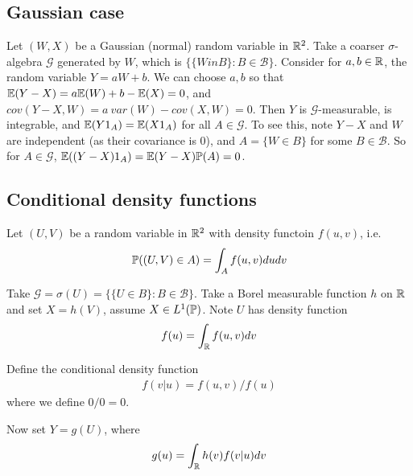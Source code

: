 \documentclass[a4paper]{article}
\begin{document}
\subsection{Gaussian case}
Let $(W,X)$ be a Gaussian (normal) random variable in $\R^2$. Take a coarser $\sigma$-algebra $\mathcal{G}$ generated by $W$, which is $\{\{W in B\}: B \in \mathcal{B}\}$. Consider for $a,b \in \R$, the random variable $Y = aW + b$. We can choose $a,b$ so that $\E(Y-X) = a \E(W)+b - \E(X) = 0$, and $cov(Y-X,W) = a\ var(W) - cov(X,W) =0$. Then $Y$ is $\mathcal{G}$-measurable, is integrable, and $\E(Y1_A) = \E(X1_A)$ for all $A \in \mathcal{G}$. To see this, note $Y-X$ and $W$ are independent (as their covariance is 0), and $A = \{W \in B\}$ for some $B \in \mathcal{B}$. So for $A \in \mathcal{G}$, $\E((Y-X)1_A) = \E(Y-X)\P(A) = 0$.

\subsection{Conditional density functions}
Let $(U,V)$ be a random variable in $\R^2$ with density functoin $f(u,v)$, i.e.
\begin{equation*}
\begin{aligned}
\P((U,V) \in A) = \int_A f(u,v) dudv
\end{aligned}
\end{equation*}

Take $\mathcal{G} = \sigma(U) = \{\{U \in B\}:B \in \mathcal{B}\}$. Take a Borel measurable function $h$ on $\R$ and set $X = h(V)$, assume $X \in L^1(\P)$. Note $U$ has density function 
\begin{equation*}
\begin{aligned}
f(u) = \int_\R f(u,v) dv
\end{aligned}
\end{equation*}

Define the conditional density function
\begin{equation*}
\begin{aligned}
f(v|u) = f(u,v) / f(u)
\end{aligned}
\end{equation*}
where we define $0/0 = 0$.

Now set $Y = g(U)$, where 
\begin{equation*}
\begin{aligned}
g(u) = \int_\R h(v) f(v|u) dv
\end{aligned}
\end{equation*}
\end{document}
